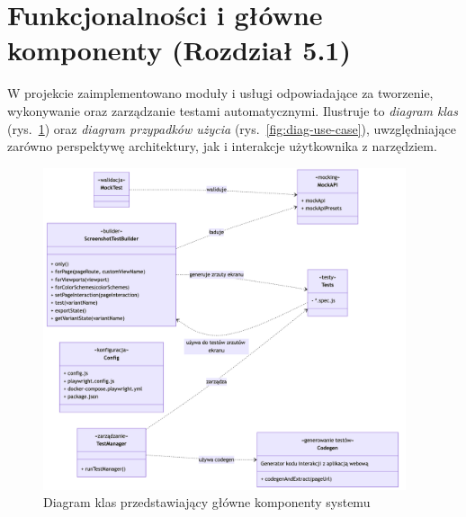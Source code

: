 \documentclass[12pt]{report}
\begin{document}
\section{Funkcjonalności i główne komponenty (Rozdział 5.1)}
\label{sec:przeglad-funkcjonalnosci}

W projekcie zaimplementowano moduły i usługi odpowiadające za tworzenie, wykonywanie oraz zarządzanie testami automatycznymi. Ilustruje to \emph{diagram klas} (rys.~\ref{fig:diag-klas}) oraz \emph{diagram przypadków użycia} (rys.~\ref{fig:diag-use-case}), uwzględniające zarówno perspektywę architektury, jak i interakcje użytkownika z narzędziem.

\begin{figure}[H]
\centering
\includegraphics[width=0.95\textwidth]{diagram-projekt.png}
\caption{Diagram klas przedstawiający główne komponenty systemu}
\label{fig:diag-klas}
\end{figure}
\end{document}
